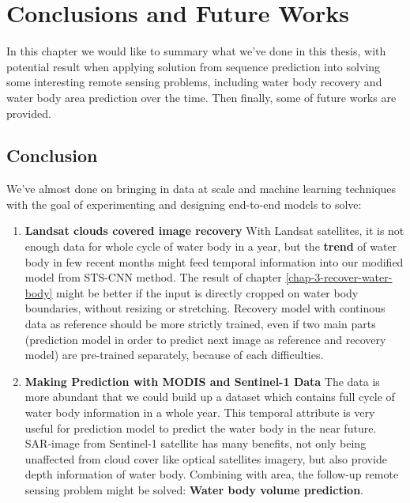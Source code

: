 \chapter{Conclusions and Future Works}
\label{chap-6-conclusions}
\begin{ChapAbstract}
In this chapter we would like to summary what we've done in this thesis, with potential result when applying solution from sequence prediction into solving some interesting remote sensing problems, including water body recovery and water body area prediction over the time. Then finally, some of future works are provided.
\end{ChapAbstract}

\section{Conclusion}

We've almost done on bringing in data at scale and machine learning techniques with the goal of experimenting and designing end-to-end models to solve:

\begin{enumerate}
	\item \textbf{Landsat clouds covered image recovery} With Landsat satellites, it is not enough data for whole cycle of water body in a year, but the \textbf{trend} of water body in few recent months might feed temporal information into our modified model from STS-CNN method. The result of chapter \ref{chap-3-recover-water-body} might be better if the input is directly cropped on water body boundaries, without resizing or stretching. Recovery model with continous data as reference should be more strictly trained, even if two main parts (prediction model in order to predict next image as reference and recovery model) are pre-trained separately, because of each difficulties.
	
	\item \textbf{Making Prediction with MODIS and Sentinel-1 Data} The data is more abundant that we could build up a dataset which contains full cycle of water body information in a whole year. This temporal attribute is very useful for prediction model to predict the water body in the near future. SAR-image from Sentinel-1 satellite has many benefits, not only being unaffected from cloud cover like optical satellites imagery, but also provide depth information of water body. Combining with area, the follow-up remote sensing problem might be solved: \textbf{Water body volume prediction}.
\end{enumerate}

